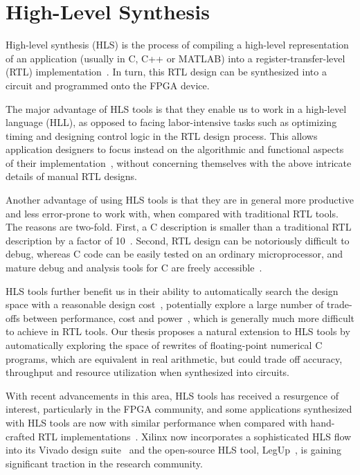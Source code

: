 \section{High-Level Synthesis}
\label{bg:sec:high_level_synthesis}

High-level synthesis (HLS) is the process of compiling a high-level
representation of an application (usually in C, C++ or MATLAB) into a
register-transfer-level (RTL) implementation~\cite{coussy, gajski}.  In turn,
this RTL design can be synthesized into a circuit and programmed onto the FPGA
device.

The major advantage of HLS tools is that they enable us to work in a high-level
language (HLL), as opposed to facing labor-intensive tasks such as optimizing
timing and designing control logic in the RTL design process.  This allows
application designers to focus instead on the algorithmic and functional
aspects of their implementation~\cite{coussy}, without concerning themselves
with the above intricate details of manual RTL designs.

Another advantage of using HLS tools is that they are in general more
productive and less error-prone to work with, when compared with traditional
RTL tools.  The reasons are two-fold.  First, a C description is smaller than
a traditional RTL description by a factor of 10~\cite{coussy, bdti}.  Second,
RTL design can be notoriously difficult to debug, whereas C code can be easily
tested on an ordinary microprocessor, and mature debug and analysis tools for C
are freely accessible~\cite{canis13}.

HLS tools further benefit us in their ability to automatically search
the design space with a reasonable design cost~\cite{bdti}, potentially
explore a large number of trade-offs between performance, cost and
power~\cite{mcfarland}, which is generally much more difficult to achieve
in RTL tools.  Our thesis proposes a natural extension to HLS tools by
automatically exploring the space of rewrites of floating-point numerical
C programs, which are equivalent in real arithmetic, but could trade off
accuracy, throughput and resource utilization when synthesized into circuits.

With recent advancements in this area, HLS tools has received a resurgence of
interest, particularly in the FPGA community, and some applications synthesized
with HLS tools are now with similar performance when compared with hand-crafted
RTL implementations~\cite{bdti}.  Xilinx now incorporates a sophisticated HLS
flow into its Vivado design suite~\cite{vivado_hls} and the open-source HLS
tool, LegUp~\cite{legup}, is gaining significant traction in the research
community.


